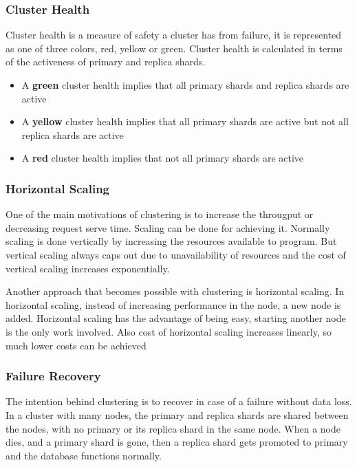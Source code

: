 \documentclass[12pt]{article}
\begin{document}
			\subsubsection{Cluster Health}
				Cluster health is a measure of safety a cluster has from failure, it is represented as one of three colors, red, yellow or green. Cluster health is calculated in terms of the activeness of primary and replica shards.

				\begin{itemize}
				\item A \textbf{green} cluster health implies that all primary shards and replica shards are active
				\item A \textbf{yellow} cluster health implies that all primary shards are active but not all replica shards are active
				\item A \textbf{red} cluster health implies that not all primary shards are active
				\end{itemize}

			\subsubsection{Horizontal Scaling}
				One of the main motivations of clustering is to increase the througput or decreasing request serve time. Scaling can be done for achieving it. Normally scaling is done vertically by increasing the resources available to program. But vertical scaling always caps out due to unavailability of resources and the cost of vertical scaling increases exponentially.

				Another approach that becomes possible with clustering is horizontal scaling. In horizontal scaling, instead of increasing performance in the node, a new node is added. Horizontal scaling has the advantage of being easy, starting another node is the only work involved. Also cost of horizontal scaling increases linearly, so much lower costs can be achieved

			\subsubsection{Failure Recovery}
				The intention behind clustering is to recover in case of a failure without data loss. In a cluster with many nodes, the primary and replica shards are shared between the nodes, with no primary or its replica shard in the same node. When a node dies, and a primary shard is gone, then a replica shard gets promoted to primary and the database functions normally.
\end{document}
